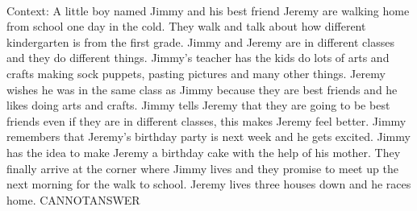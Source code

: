 \documentclass[11pt,a4paper, onecolumn]{article}
\begin{document}
\\ Context: A little boy named Jimmy and his best friend Jeremy are walking home from school one day in the cold. They walk and talk about how different kindergarten is from the first grade. Jimmy and Jeremy are in different classes and they do different things. Jimmy's teacher has the kids do lots of arts and crafts making sock puppets, pasting pictures and many other things. Jeremy wishes he was in the same class as Jimmy because they are best friends and he likes doing arts and crafts. Jimmy tells Jeremy that they are going to be best friends even if they are in different classes, this makes Jeremy feel better. Jimmy remembers that Jeremy's birthday party is next week and he gets excited. Jimmy has the idea to make Jeremy a birthday cake with the help of his mother. They finally arrive at the corner where Jimmy lives and they promise to meet up the next morning for the walk to school. Jeremy lives three houses down and he races home. CANNOTANSWER
\end{document}
